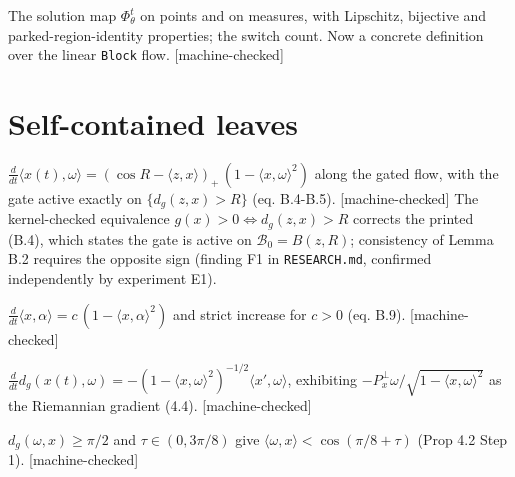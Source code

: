 \begin{definition}\label{ax:flow}
The solution map $\Phi_\theta^t$ on points and on measures, with Lipschitz, bijective and
parked-region-identity properties; the switch count. Now a concrete definition over the linear
\texttt{Block} flow. [machine-checked]
\end{definition}

\section{Self-contained leaves}

\begin{lemma}\label{lem:gate}\leanok
$\frac{d}{dt}\langle x(t),\omega\rangle = (\cos R - \langle z,x\rangle)_+\,(1-\langle x,\omega\rangle^2)$
along the gated flow, with the gate active exactly on $\{d_g(z,x)>R\}$ (eq. B.4-B.5). [machine-checked]
The kernel-checked equivalence $g(x)>0 \iff d_g(z,x)>R$ corrects the printed (B.4), which states the
gate is active on $\mathcal B_0=B(z,R)$; consistency of Lemma B.2 requires the opposite sign
(finding F1 in \texttt{RESEARCH.md}, confirmed independently by experiment E1).
\end{lemma}

\begin{lemma}\label{lem:bary}\leanok
$\frac{d}{dt}\langle x,\alpha\rangle = c\,(1-\langle x,\alpha\rangle^2)$ and strict increase for
$c>0$ (eq. B.9). [machine-checked]
\end{lemma}

\begin{lemma}\label{lem:grad}\leanok
$\frac{d}{dt} d_g(x(t),\omega) = -(1-\langle x,\omega\rangle^2)^{-1/2}\langle x',\omega\rangle$,
exhibiting $-P_x^\perp\omega/\sqrt{1-\langle x,\omega\rangle^2}$ as the Riemannian gradient (4.4). [machine-checked]
\end{lemma}

\begin{lemma}\label{lem:sep}\leanok
$d_g(\omega,x)\ge\pi/2$ and $\tau\in(0,3\pi/8)$ give $\langle\omega,x\rangle<\cos(\pi/8+\tau)$ (Prop 4.2 Step 1). [machine-checked]
\end{lemma}

